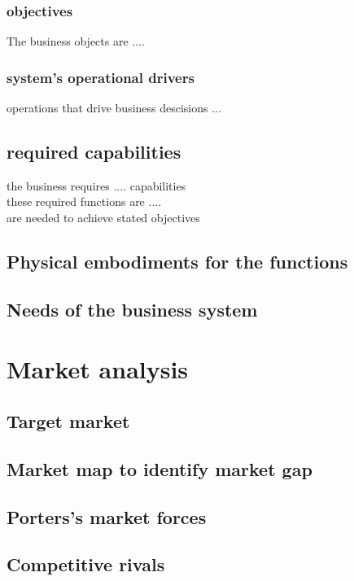 \documentclass{article}
\begin{document}
    \subsubsection{objectives}
      The business objects are ....
    \subsubsection{system's operational drivers}
      operations that drive business descisions ...

    \subsection{required capabilities}
      the business requires .... capabilities \\
      these required functions are .... \\
      are needed to achieve stated objectives \\

    \subsection{Physical embodiments for the functions}

    \subsection{Needs of the business system}

  




  \newpage{}
  \section{Market analysis}
    \subsection{Target market}

    \subsection{Market map to identify market gap}

    \subsection{Porters's market forces}

    \subsection{Competitive rivals}
\end{document}
